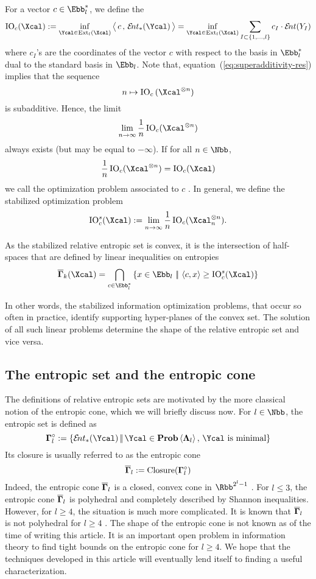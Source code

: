   For a vector $c \in \Ebb_{l}^*$, we define the
  \[
  \IO_{c}(\Xcal) 
  := 
  \inf_{\Ycal \in \Ext_l(\Xcal)} 
    \big\langle\, c\, ,\, \Ent_*(\Ycal)\,\big\rangle
  = 
  \inf_{\Ycal \in \Ext_l(\Xcal)} 
    \sum_{I \subset \{1, \dots, l\}} c_I \cdot\Ent (Y_I)
  \]
  where $c_{I}$'s are the coordinates of the vector $c$ with respect
  to the basis in $\Ebb^{*}_{l}$ dual to the standard basis in
  $\Ebb_{l}$.  Note that, equation~(\ref{eq:superadditivity-res})
  implies that the sequence
  \[
  n \mapsto \IO_{c}{(\Xcal^{\otimes n})}
  \]
  is subadditive.  Hence, the limit
  \[
  \lim_{n \to \infty} \frac{1}{n} \IO_{c}(\Xcal^{\otimes n})
  \]
  always exists (but may be equal to $-\infty$). If for all $n \in \Nbb$, 
  \[
  \frac{1}{n} \IO_{c}(\Xcal^{\otimes n}) = \IO_{c}(\Xcal)
  \]
  we call the optimization problem associated
  to $c$ .  In general, we
  define the stabilized optimization problem
  \[
  \IO^s_{c}(\Xcal) := 
  \lim_{n \to \infty} \frac{1}{n} \IO_{c}(\Xcal_n^{\otimes n}).
  \]
  
  As the stabilized relative entropic set is convex, it is the
  intersection of half-spaces that are defined by linear inequalities
  on entropies
  \[
  \sres_k(\Xcal) 
  = 
  \bigcap_{c \in \Ebb_{l}^{*}} 
  \set{ x \in \Ebb_{l} \, 
    \st 
    \, \langle c,x\rangle \geq \IO^s_{c}(\Xcal) }
  \]

  In other words, the stabilized information optimization problems,
  that occur so often in practice, identify supporting hyper-planes of
  the convex set.  The solution of all such linear problems determine
  the shape of the relative entropic set and vice versa.


\subsection{The entropic set and the entropic cone}
  The definitions of relative entropic sets are motivated by the more
  classical notion of the entropic
  cone, which we will briefly discuss now.  For $l \in \Nbb$, the
  entropic set is defined as
  \[
  \res_l 
  := 
  \set{ \ent_*(\Ycal) 
    \st 
    \Ycal \in \prob\<\Lambdabf_l>,\,\Ycal \text{ is minimal} 
  }
  \]
  Its closure is usually referred to as the entropic cone
  \[
  \overline{\bm\Gamma}_l 
  := 
  \operatorname{\mathrm{Closure}}(\bm\Gamma^{\circ}_l)
  \]
  Indeed, the entropic cone $\overline{\bm\Gamma}_l$ is a closed, convex cone in
  $\Rbb^{2^l-1}$ \cite{Yeung-First-2012}. For $l \leq 3$, the entropic
  cone $\overline{\bm\Gamma}_l$ is polyhedral and completely described by Shannon
  inequalities. However, for $l \geq 4$, the situation is much more
  complicated. It is known that $\overline{\bm\Gamma}_l$ is not polyhedral for $l
  \geq 4$ \cite{Matus-Infinitely-2007}. The shape of the entropic cone
  is not known as of the time of writing this article. It is an
  important open problem in information theory to find tight bounds on
  the entropic cone for $l \geq 4$. We hope that the techniques
  developed in this article will eventually lend itself to finding a
  useful characterization.


